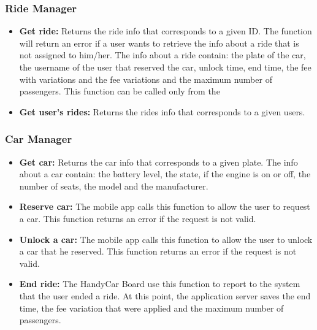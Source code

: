 \subsubsection{Ride Manager}
\begin{itemize}
	\item \textbf{Get ride:} Returns the ride info that corresponds to a given ID. The function will return an error if a user wants to retrieve the info about a ride that is not assigned to him/her.
	The info about a ride contain: the plate of the car, the username of the user that reserved the car, unlock time, %
	end time, the fee with variations and the fee variations and the maximum number of passengers. This function can be called only from the 
	\item \textbf{Get user's rides:} Returns the rides info that corresponds to a given users.
\end{itemize}

\subsubsection{Car Manager}
\begin{itemize}
	\item \textbf{Get car:} Returns the car info that corresponds to a given plate.
	The info about a car contain: the battery level, the state, if the engine is on or off, the number of seats,  the model and the manufacturer.
	\item \textbf{Reserve car:} The mobile app calls this function to allow the user to request a car. This function returns an error if the request is not valid.
	\item \textbf{Unlock a car:} The mobile app calls this function to allow the user to unlock a car that he reserved. This function returns an error if the request is not valid.
	\item \textbf{End ride:} The HandyCar Board use this function to report to the system that the user ended a ride. At this point, the application server saves the end time, the fee variation that were applied and the maximum number of passengers.
\end{itemize}

